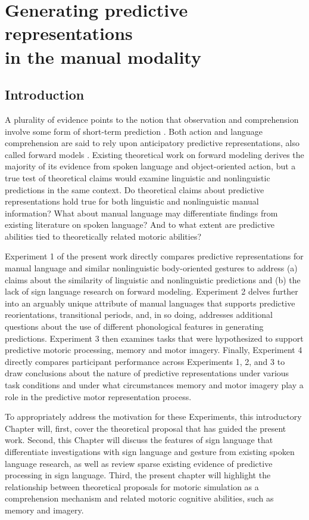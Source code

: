 
\section[Generating predictive representations in the manual modality]{Generating predictive representations\\ \hspace{.31in} in the manual modality}
    \setcounter{page}{1} \renewcommand{\thepage}{\arabic{page}} 
    \subsection{Introduction}
                A plurality of evidence points to the notion that observation and comprehension involve some form of short-term prediction \cite{kutas2011, wilson2005}. Both action and language comprehension are said to rely upon anticipatory predictive representations, also called forward models \cite{PG}. Existing theoretical work on forward modeling derives the majority of its evidence from spoken language and object-oriented action, but a true test of theoretical claims would examine linguistic and nonlinguistic predictions in the same context. Do theoretical claims about predictive representations hold true for both linguistic and nonlinguistic manual information? What about manual language may differentiate findings from existing literature on spoken language? And to what extent are predictive abilities tied to theoretically related motoric abilities? \par
                Experiment 1 of the present work directly compares predictive representations for manual language and similar nonlinguistic body-oriented gestures to address (a) claims about the similarity of linguistic and nonlinguistic predictions and (b) the lack of sign language research on forward modeling. Experiment 2 delves further into an arguably unique attribute of manual languages that supports predictive reorientations, transitional periods, and, in so doing, addresses additional questions about the use of different phonological features in generating predictions. Experiment 3 then examines tasks that were hypothesized to support predictive motoric processing, memory and motor imagery. Finally, Experiment 4 directly compares participant performance across Experiments 1, 2, and 3 to draw conclusions about the nature of predictive representations under various task conditions and under what circumstances memory and motor imagery play a role in the predictive motor representation process. \par
                To appropriately address the motivation for these Experiments, this introductory Chapter will, first, cover the theoretical proposal that has guided the present work. Second, this Chapter will discuss the features of sign language that differentiate investigations with sign language and gesture from existing spoken language research, as well as review sparse existing evidence of predictive processing in sign language. Third, the present chapter will highlight the relationship between theoretical proposals for motoric simulation as a comprehension mechanism and related motoric cognitive abilities, such as memory and imagery.
